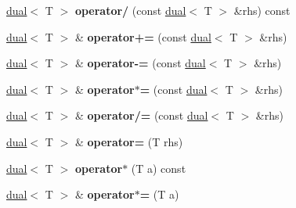 \begin{DoxyCompactItemize}
\item 
\hypertarget{struct_d_r_d_s_p_1_1dual_ac838ce569f85fd920d587bfe22b4228c}{\hyperlink{struct_d_r_d_s_p_1_1dual}{dual}$<$ T $>$ {\bfseries operator/} (const \hyperlink{struct_d_r_d_s_p_1_1dual}{dual}$<$ T $>$ \&rhs) const }\label{struct_d_r_d_s_p_1_1dual_ac838ce569f85fd920d587bfe22b4228c}

\item 
\hypertarget{struct_d_r_d_s_p_1_1dual_af928d72c558bc5251f48e3a8ef43e499}{\hyperlink{struct_d_r_d_s_p_1_1dual}{dual}$<$ T $>$ \& {\bfseries operator+=} (const \hyperlink{struct_d_r_d_s_p_1_1dual}{dual}$<$ T $>$ \&rhs)}\label{struct_d_r_d_s_p_1_1dual_af928d72c558bc5251f48e3a8ef43e499}

\item 
\hypertarget{struct_d_r_d_s_p_1_1dual_aeea91211e526cfd1ff76dd99228045fa}{\hyperlink{struct_d_r_d_s_p_1_1dual}{dual}$<$ T $>$ \& {\bfseries operator-\/=} (const \hyperlink{struct_d_r_d_s_p_1_1dual}{dual}$<$ T $>$ \&rhs)}\label{struct_d_r_d_s_p_1_1dual_aeea91211e526cfd1ff76dd99228045fa}

\item 
\hypertarget{struct_d_r_d_s_p_1_1dual_a5bdcc4cd454cd6b3a775d0e3ac9de853}{\hyperlink{struct_d_r_d_s_p_1_1dual}{dual}$<$ T $>$ \& {\bfseries operator$\ast$=} (const \hyperlink{struct_d_r_d_s_p_1_1dual}{dual}$<$ T $>$ \&rhs)}\label{struct_d_r_d_s_p_1_1dual_a5bdcc4cd454cd6b3a775d0e3ac9de853}

\item 
\hypertarget{struct_d_r_d_s_p_1_1dual_a68be03e1a9a0ae79edbcb1b012b4567b}{\hyperlink{struct_d_r_d_s_p_1_1dual}{dual}$<$ T $>$ \& {\bfseries operator/=} (const \hyperlink{struct_d_r_d_s_p_1_1dual}{dual}$<$ T $>$ \&rhs)}\label{struct_d_r_d_s_p_1_1dual_a68be03e1a9a0ae79edbcb1b012b4567b}

\item 
\hypertarget{struct_d_r_d_s_p_1_1dual_ac694c41d16a43f1a563d03dfda4cd7de}{\hyperlink{struct_d_r_d_s_p_1_1dual}{dual}$<$ T $>$ \& {\bfseries operator=} (T rhs)}\label{struct_d_r_d_s_p_1_1dual_ac694c41d16a43f1a563d03dfda4cd7de}

\item 
\hypertarget{struct_d_r_d_s_p_1_1dual_a6ebef014f1f9a8286129e2ee4349bb94}{\hyperlink{struct_d_r_d_s_p_1_1dual}{dual}$<$ T $>$ {\bfseries operator$\ast$} (T a) const }\label{struct_d_r_d_s_p_1_1dual_a6ebef014f1f9a8286129e2ee4349bb94}

\item 
\hypertarget{struct_d_r_d_s_p_1_1dual_a3806b3efe14465534ae3f69931c1728f}{\hyperlink{struct_d_r_d_s_p_1_1dual}{dual}$<$ T $>$ \& {\bfseries operator$\ast$=} (T a)}\label{struct_d_r_d_s_p_1_1dual_a3806b3efe14465534ae3f69931c1728f}


\end{DoxyCompactItemize}
